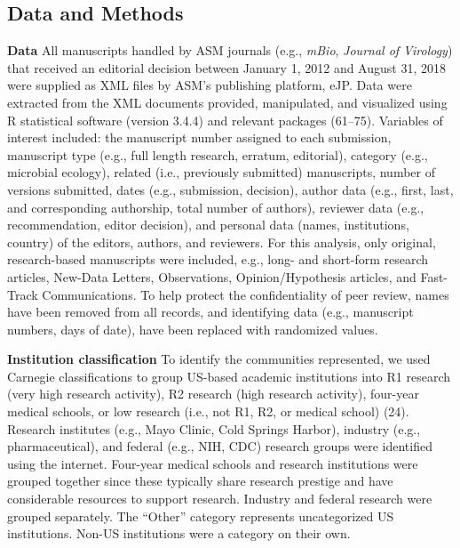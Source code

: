\documentclass[11pt,]{article}
\begin{document}
\subsection{Data and Methods}\label{data-and-methods}

\textbf{Data} All manuscripts handled by ASM journals (e.g.,
\emph{mBio}, \emph{Journal of Virology}) that received an editorial
decision between January 1, 2012 and August 31, 2018 were supplied as
XML files by ASM's publishing platform, eJP. Data were extracted from
the XML documents provided, manipulated, and visualized using R
statistical software (version 3.4.4) and relevant packages (61--75).
Variables of interest included: the manuscript number assigned to each
submission, manuscript type (e.g., full length research, erratum,
editorial), category (e.g., microbial ecology), related (i.e.,
previously submitted) manuscripts, number of versions submitted, dates
(e.g., submission, decision), author data (e.g., first, last, and
corresponding authorship, total number of authors), reviewer data (e.g.,
recommendation, editor decision), and personal data (names,
institutions, country) of the editors, authors, and reviewers. For this
analysis, only original, research-based manuscripts were included, e.g.,
long- and short-form research articles, New-Data Letters, Observations,
Opinion/Hypothesis articles, and Fast-Track Communications. To help
protect the confidentiality of peer review, names have been removed from
all records, and identifying data (e.g., manuscript numbers, days of
date), have been replaced with randomized values.

\textbf{Institution classification} To identify the communities
represented, we used Carnegie classifications to group US-based academic
institutions into R1 research (very high research activity), R2 research
(high research activity), four-year medical schools, or low research
(i.e., not R1, R2, or medical school) (24). Research institutes (e.g.,
Mayo Clinic, Cold Springs Harbor), industry (e.g., pharmaceutical), and
federal (e.g., NIH, CDC) research groups were identified using the
internet. Four-year medical schools and research institutions were
grouped together since these typically share research prestige and have
considerable resources to support research. Industry and federal
research were grouped separately. The ``Other'' category represents
uncategorized US institutions. Non-US institutions were a category on
their own.
\end{document}
